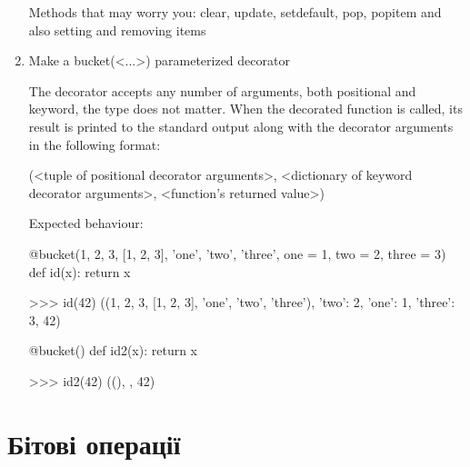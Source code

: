 \documentclass[]{article}
\begin{document}
\begin{enumerate}
Methods that may worry you: clear, update, setdefault, pop, popitem and also setting and removing items
\item


Make a bucket(<...>) parameterized decorator

The decorator accepts any number of arguments, both positional and keyword, the type does not matter. When the decorated function is called, its result is printed to the standard output along with the decorator arguments in the following format:

(<tuple of positional decorator arguments>, <dictionary of keyword decorator arguments>, <function's returned value>)

 

Expected behaviour:

@bucket(1, 2, 3, [1, 2, 3], 'one', 'two', 'three', one = 1, two = 2, three = 3)
def id(x):
  return x

>>> id(42)
((1, 2, 3, [1, 2, 3], 'one', 'two', 'three'), {'two': 2, 'one': 1, 'three': 3}, 42)



@bucket()
def id2(x):
  return x

>>> id2(42)
((), {}, 42)



\end{enumerate}

\section{Бітові операції}
\end{document}
